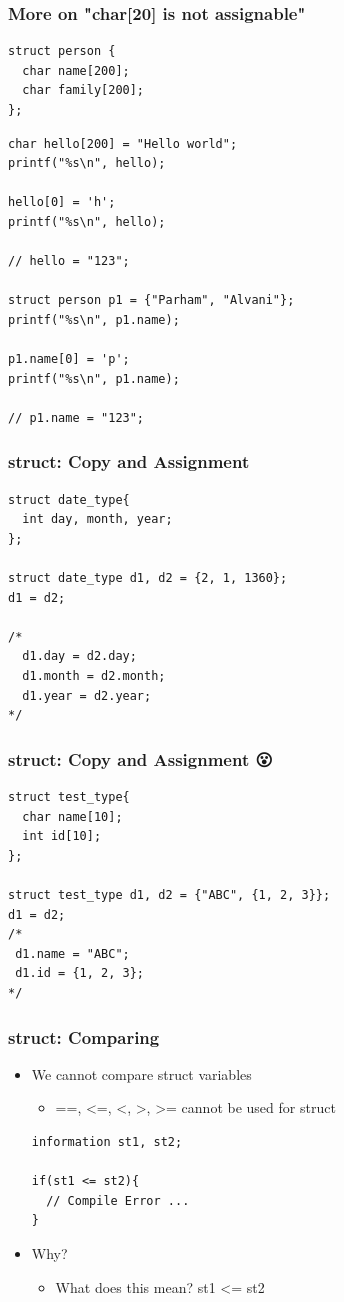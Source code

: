 \documentclass{../c-lecture}
\begin{document}
\begin{frame}[fragile]
  \frametitle{More on "char[20] is not assignable"}
  \begin{verbatim}
struct person {
  char name[200];
  char family[200];
};
  \end{verbatim}
  \scriptsize
  \begin{verbatim}
char hello[200] = "Hello world";
printf("%s\n", hello);

hello[0] = 'h';
printf("%s\n", hello);

// hello = "123";

struct person p1 = {"Parham", "Alvani"};
printf("%s\n", p1.name);

p1.name[0] = 'p';
printf("%s\n", p1.name);

// p1.name = "123";
  \end{verbatim}
\end{frame}

\begin{frame}[fragile]
  \frametitle{struct: Copy and Assignment}
  \begin{verbatim}
struct date_type{
  int day, month, year;
};

struct date_type d1, d2 = {2, 1, 1360};
d1 = d2;

/*
  d1.day = d2.day;
  d1.month = d2.month;
  d1.year = d2.year;
*/
  \end{verbatim}
\end{frame}

\begin{frame}[fragile]
  \frametitle{struct: Copy and Assignment 😮}
  \begin{verbatim}
struct test_type{
  char name[10];
  int id[10];
};

struct test_type d1, d2 = {"ABC", {1, 2, 3}};
d1 = d2;
/*
 d1.name = "ABC";
 d1.id = {1, 2, 3};
*/

  \end{verbatim}
\end{frame}

\begin{frame}[fragile]
  \frametitle{struct: Comparing}
  \begin{itemize}
    \item
      We cannot compare struct variables
    \begin{itemize}
      \item ==, <=, <, >, >= cannot be used for struct
    \end{itemize}
    \begin{verbatim}
information st1, st2;

if(st1 <= st2){
  // Compile Error ...
}

    \end{verbatim}
    \item Why?
    \begin{itemize}
      \item What does this mean? st1 <= st2
    \end{itemize}
  \end{itemize}
\end{frame}
\end{document}
